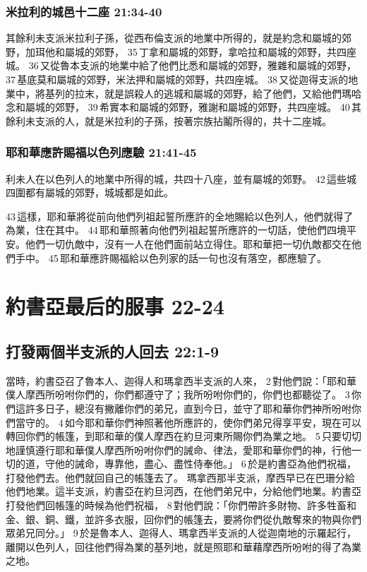 \subsubsection{米拉利的城邑十二座 21:34-40}
其餘利未支派米拉利子孫，從西布倫支派的地業中所得的，就是約念和屬城的郊野，加珥他和屬城的郊野， 35 丁拿和屬城的郊野，拿哈拉和屬城的郊野，共四座城。 36 又從魯本支派的地業中給了他們比悉和屬城的郊野，雅雜和屬城的郊野， 37 基底莫和屬城的郊野，米法押和屬城的郊野，共四座城。 38 又從迦得支派的地業中，將基列的拉末，就是誤殺人的逃城和屬城的郊野，給了他們，又給他們瑪哈念和屬城的郊野， 39 希實本和屬城的郊野，雅謝和屬城的郊野，共四座城。 40 其餘利未支派的人，就是米拉利的子孫，按著宗族拈鬮所得的，共十二座城。

\subsubsection{耶和華應許賜福以色列應驗 21:41-45}
利未人在以色列人的地業中所得的城，共四十八座，並有屬城的郊野。 42 這些城四圍都有屬城的郊野，城城都是如此。

43 這樣，耶和華將從前向他們列祖起誓所應許的全地賜給以色列人，他們就得了為業，住在其中。 44 耶和華照著向他們列祖起誓所應許的一切話，使他們四境平安。他們一切仇敵中，沒有一人在他們面前站立得住。耶和華把一切仇敵都交在他們手中。 45 耶和華應許賜福給以色列家的話一句也沒有落空，都應驗了。



\section{約書亞最后的服事 22-24}

\subsection{打發兩個半支派的人回去 22:1-9}
當時，約書亞召了魯本人、迦得人和瑪拿西半支派的人來， 2 對他們說：「耶和華僕人摩西所吩咐你們的，你們都遵守了；我所吩咐你們的，你們也都聽從了。 3 你們這許多日子，總沒有撇離你們的弟兄，直到今日，並守了耶和華你們神所吩咐你們當守的。 4 如今耶和華你們神照著他所應許的，使你們弟兄得享平安，現在可以轉回你們的帳篷，到耶和華的僕人摩西在約旦河東所賜你們為業之地。 5 只要切切地謹慎遵行耶和華僕人摩西所吩咐你們的誡命、律法，愛耶和華你們的神，行他一切的道，守他的誡命，專靠他，盡心、盡性侍奉他。」 6 於是約書亞為他們祝福，打發他們去。他們就回自己的帳篷去了。
瑪拿西那半支派，摩西早已在巴珊分給他們地業。這半支派，約書亞在約旦河西，在他們弟兄中，分給他們地業。約書亞打發他們回帳篷的時候為他們祝福， 8 對他們說：「你們帶許多財物、許多牲畜和金、銀、銅、鐵，並許多衣服，回你們的帳篷去，要將你們從仇敵奪來的物與你們眾弟兄同分。」 9 於是魯本人、迦得人、瑪拿西半支派的人從迦南地的示羅起行，離開以色列人，回往他們得為業的基列地，就是照耶和華藉摩西所吩咐的得了為業之地。

